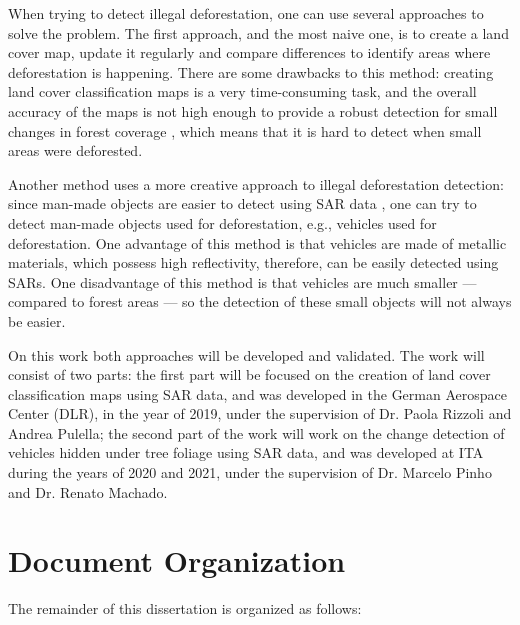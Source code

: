 When trying to detect illegal deforestation, one can use several approaches to solve the problem. The first approach, and the most naive one, is to create a land cover map, update it regularly and compare differences to identify
areas where deforestation is happening. There are some drawbacks to this method: creating land cover classification maps is a very time-consuming task, and the overall accuracy of the maps is not high enough to provide a robust detection for small changes in forest coverage \cite{Rodrigo}, which means that it is hard to detect when small areas were deforested.

Another method uses a more creative approach to illegal deforestation detection: since man-made objects are easier to detect using SAR data \cite{manmade}, one can try to detect man-made objects used for deforestation, e.g., vehicles used for deforestation.
One advantage of this method is that vehicles are made of metallic materials, which possess high reflectivity, therefore, can be easily detected using SARs. One disadvantage of this method is that vehicles are much smaller — compared to forest areas — so the detection of these small objects will not always be easier.

On this work both approaches will be developed and validated. The work will consist of two parts: the first part will be focused on the creation of land cover classification maps
using SAR data, and was developed in the German Aerospace Center (DLR), in the year of 2019, under the supervision of Dr. Paola Rizzoli and Andrea Pulella; the second part of the work will work on the
change detection of vehicles hidden under tree foliage using SAR data, and was developed at ITA during the years of 2020 and 2021, under the supervision of Dr. Marcelo Pinho and Dr. Renato Machado.

\section{Document Organization}
The remainder of this dissertation is organized as follows:

